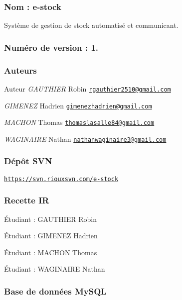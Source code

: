 \subsubsection*{Nom \+: e-\/stock}

Système de gestion de stock automatisé et communicant.

\subsubsection*{Numéro de version \+: 1.}

\subsubsection*{Auteurs}

\begin{DoxyAuthor}{Auteur}
{\itshape G\+A\+U\+T\+H\+I\+ER} Robin \href{mailto:rgauthier2510@gmail.com}{\tt rgauthier2510@gmail.\+com}

{\itshape G\+I\+M\+E\+N\+EZ} Hadrien \href{mailto:gimenezhadrien@gmail.com}{\tt gimenezhadrien@gmail.\+com}

{\itshape M\+A\+C\+H\+ON} Thomas \href{mailto:thomaslasalle84@gmail.com}{\tt thomaslasalle84@gmail.\+com}

{\itshape W\+A\+G\+I\+N\+A\+I\+RE} Nathan \href{mailto:nathanwaginaire3@gmail.com}{\tt nathanwaginaire3@gmail.\+com}
\end{DoxyAuthor}
\subsubsection*{Dépôt S\+VN}

\href{https://svn.riouxsvn.com/e-stock}{\tt https\+://svn.\+riouxsvn.\+com/e-\/stock}

\subsubsection*{Recette IR}


\begin{DoxyItemize}
\item Étudiant \+: G\+A\+U\+T\+H\+I\+ER Robin
\item Étudiant \+: G\+I\+M\+E\+N\+EZ Hadrien
\item Étudiant \+: M\+A\+C\+H\+ON Thomas
\item Étudiant \+: W\+A\+G\+I\+N\+A\+I\+RE Nathan
\end{DoxyItemize}

\subsubsection*{Base de données My\+S\+QL}


